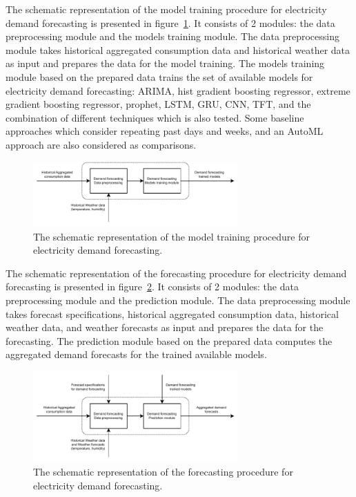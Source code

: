 The schematic representation of the model training procedure for electricity demand forecasting is presented in figure~\ref{fig:modeltrainingdemand}.
It consists of 2 modules: the data preprocessing module and the models training module.
The data preprocessing module takes historical aggregated consumption data and historical weather data as input and prepares the data for the model training.
The models training module based on the prepared data trains the set of available models for electricity demand forecasting: ARIMA, hist gradient boosting regressor, extreme gradient boosting regressor, prophet, LSTM, GRU, CNN, TFT, and the combination of different techniques which is also tested.
Some baseline approaches which consider repeating past days and weeks, and an AutoML approach are also considered as comparisons.

\begin{figure}[H]
\centering
\includegraphics[width=0.7\textwidth]{images/system_model_training_demand}
\caption{The schematic representation of the model training procedure for electricity demand forecasting.}
\label{fig:modeltrainingdemand}
\end{figure}

The schematic representation of the forecasting procedure for electricity demand forecasting is presented in figure~\ref{fig:modelforecastingdemand}.
It consists of 2 modules: the data preprocessing module and the prediction module.
The data preprocessing module takes forecast specifications, historical aggregated consumption data, historical weather data, and weather forecasts as input and prepares the data for the forecasting.
The prediction module based on the prepared data computes the aggregated demand forecasts for the trained available models.

\begin{figure}[H]
\centering
\includegraphics[width=0.7\textwidth]{images/system_model_forecasting_demand}
\caption{The schematic representation of the forecasting procedure for electricity demand forecasting.}
\label{fig:modelforecastingdemand}
\end{figure}


